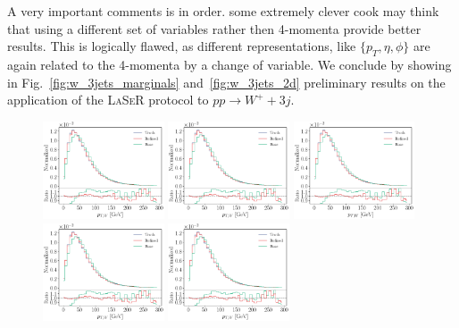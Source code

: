 %
A very important comments is in order.
some extremely clever cook may think that using a different set of variables rather then 4-momenta provide better results. This is logically flawed, as different representations, like $\{p_T, \eta, \phi\}$ are again related to the 4-momenta by a change of variable.
%
We conclude by showing in Fig.~\ref{fig:w_3jets_marginals} and~\ref{fig:w_3jets_2d} preliminary results on the application of the \textsc{LaSeR} protocol to $p p \to W^+ + 3j$.
\begin{figure}[H]
\centering
\includegraphics[width=0.32\textwidth, page=1]{./figures/wp_3j_HMC_ratio.pdf}
\includegraphics[width=0.32\textwidth, page=4]{./figures/wp_3j_HMC_ratio.pdf}
\includegraphics[width=0.32\textwidth, page=6]{./figures/wp_3j_HMC_ratio.pdf}\\
\includegraphics[width=0.32\textwidth, page=7]{./figures/wp_3j_HMC_ratio.pdf}
\includegraphics[width=0.32\textwidth, page=15]{./figures/wp_3j_HMC_ratio.pdf}

\end{figure}
